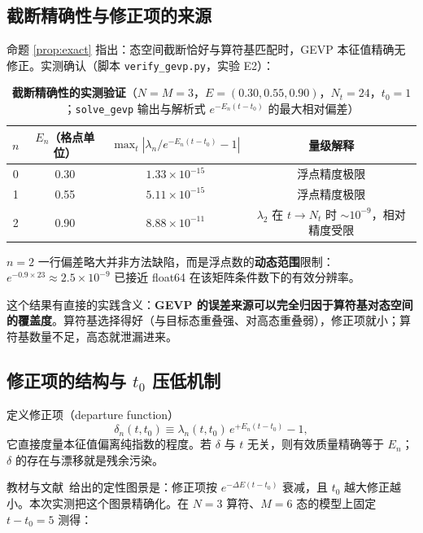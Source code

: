 \documentclass[12pt,a4paper]{ctexart}
\theoremstyle{definition}
\newcommand{\code}[1]{\texttt{#1}}
\begin{document}
\subsection{截断精确性与修正项的来源}\label{subsec:exact}

命题 \ref{prop:exact} 指出：态空间截断恰好与算符基匹配时，GEVP 本征值精确无修正。实测确认（脚本 \code{verify\_gevp.py}，实验 E2）：

\begin{table}[htbp]
\centering
\caption{\textbf{截断精确性的实测验证}（$N=M=3$，$E=(0.30,0.55,0.90)$，$N_t=24$，$t_0=1$；\code{solve\_gevp} 输出与解析式 $e^{-E_n(t-t_0)}$ 的最大相对偏差）}
\label{tab:exact}
\setlength{\tabcolsep}{4pt}
\begin{tabular}{cccc}
\toprule
$n$ & $E_n$（格点单位） & $\max_t|\lambda_n/e^{-E_n(t-t_0)} - 1|$ & 量级解释 \\
\midrule
0 & 0.30 & $1.33\times10^{-15}$ & 浮点精度极限 \\
1 & 0.55 & $5.11\times10^{-15}$ & 浮点精度极限 \\
2 & 0.90 & $8.88\times10^{-11}$ & $\lambda_2$ 在 $t\to N_t$ 时 $\sim10^{-9}$，相对精度受限 \\
\bottomrule
\end{tabular}
\end{table}

$n=2$ 一行偏差略大并非方法缺陷，而是浮点数的\textbf{动态范围}限制：$e^{-0.9\times23}\approx2.5\times10^{-9}$ 已接近 float64 在该矩阵条件数下的有效分辨率。

这个结果有直接的实践含义：\textbf{GEVP 的误差来源可以完全归因于算符基对态空间的覆盖度}。算符基选择得好（与目标态重叠强、对高态重叠弱），修正项就小；算符基数量不足，高态就泄漏进来。

\subsection{修正项的结构与 $t_0$ 压低机制}\label{subsec:t0}

定义修正项（departure function）
\begin{equation}
\delta_n(t,t_0) \equiv \lambda_n(t,t_0)\, e^{+E_n (t-t_0)} - 1 ,
\end{equation}
它直接度量本征值偏离纯指数的程度。若 $\delta$ 与 $t$ 无关，则有效质量精确等于 $E_n$；$\delta$ 的存在与漂移就是残余污染。

教材与文献~\cite{GattringerLang2010}给出的定性图景是：修正项按 $e^{-\Delta E(t-t_0)}$ 衰减，且 $t_0$ 越大修正越小。本次实测把这个图景精确化。在 $N=3$ 算符、$M=6$ 态的模型上固定 $t-t_0=5$ 测得：
\end{document}
